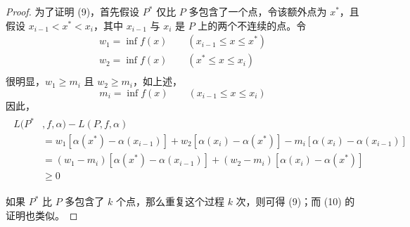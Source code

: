 \documentclass[../poma-notes.tex]{subfiles}
\begin{document}
\begin{proof}
  为了证明 (9)，首先假设 $P^*$ 仅比 $P$ 多包含了一个点，令该额外点为 $x^*$，且假设 $x_{i-1} < x^* < x_i$，其中 $x_{i-1}$ 与 $x_i$ 是
  $P$ 上的两个不连续的点。令
  \begin{gather*}
    w_1 = \inf f(x) \qquad (x_{i-1} \le x \le x^*) \\
    w_2 = \inf f(x) \qquad (x^* \le x \le x_i) \\
  \end{gather*}
  很明显，$w_1 \ge m_i$ 且 $w_2 \ge m_i$，如上述，
  \[
    m_i = \inf f(x) \qquad (x_{i-1} \le x \le x_i)
  \]
  因此，
  \begin{align*}
    \begin{split}
      L(P^* &, f, \alpha) - L(P, f, \alpha) \\
      &= w_1[\alpha(x^*) - \alpha(x_{i-1})] + w_2[\alpha(x_i) - \alpha(x^*)] - m_i [\alpha(x_i) - \alpha(x_{i-1})] \\
      &= (w_1 - m_i)[\alpha(x^*) - \alpha(x_{i-1})] + (w_2 - m_i)[\alpha(x_i) - \alpha(x^*)] \\
      &\ge 0
    \end{split}
  \end{align*}

  如果 $P^*$ 比 $P$ 多包含了 $k$ 个点，那么重复这个过程 $k$ 次，则可得 (9)；而 (10) 的证明也类似。
\end{proof}
\end{document}
